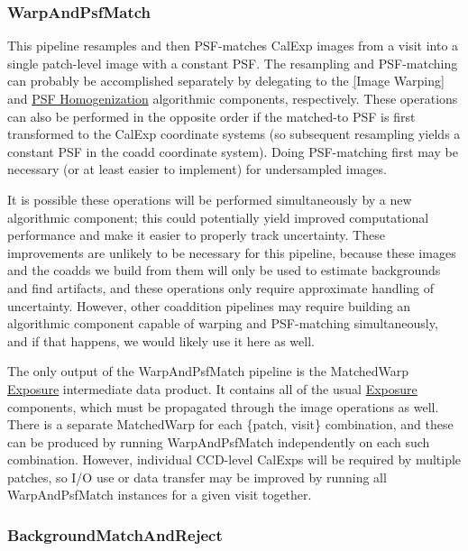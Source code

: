 \subsubsection{WarpAndPsfMatch}
\label{sec:drpWarpAndPsfMatch}

This pipeline resamples and then PSF-matches CalExp images from a visit into a single patch-level image with a constant PSF.  The resampling and PSF-matching can probably be accomplished separately by delegating to the \hyperref[sec:acWarping][Image Warping] and \hyperref[sec:acPSFHomogenization]{PSF Homogenization} algorithmic components, respectively.  These operations can also be performed in the opposite order if the matched-to PSF is first transformed to the CalExp coordinate systems (so subsequent resampling yields a constant PSF in the coadd coordinate system).  Doing PSF-matching first may be necessary (or at least easier to implement) for undersampled images.

It is possible these operations will be performed simultaneously by a new algorithmic component; this could potentially yield improved computational performance and make it easier to properly track uncertainty.  These improvements are unlikely to be necessary for this pipeline, because these images and the coadds we build from them will only be used to estimate backgrounds and find artifacts, and these operations only require approximate handling of uncertainty.  However, other coaddition pipelines may require building an algorithmic component capable of warping and PSF-matching simultaneously, and if that happens, we would likely use it here as well.

The only output of the WarpAndPsfMatch pipeline is the MatchedWarp \hyperref[sec:spImagesExposure]{Exposure} intermediate data product.  It contains all of the usual \hyperref[sec:spImagesExposure]{Exposure} components, which must be propagated through the image operations as well.  There is a separate MatchedWarp for each \{patch, visit\} combination, and these can be produced by running WarpAndPsfMatch independently on each such combination.  However, individual CCD-level CalExps will be required by multiple patches, so I/O use or data transfer may be improved by running all WarpAndPsfMatch instances for a given visit together.

\subsubsection{BackgroundMatchAndReject}
\label{sec:drpBackgroundMatchAndReject}

